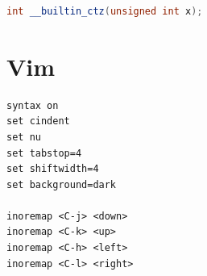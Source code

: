 \documentclass{article}
\begin{document}
\begin{lstlisting}[language=C++]
int __builtin_ctz(unsigned int x);
\end{lstlisting}

\section{Vim}

\begin{lstlisting}
syntax on
set cindent
set nu
set tabstop=4
set shiftwidth=4
set background=dark

inoremap <C-j> <down>
inoremap <C-k> <up>
inoremap <C-h> <left>
inoremap <C-l> <right>
\end{lstlisting}
\end{document}
